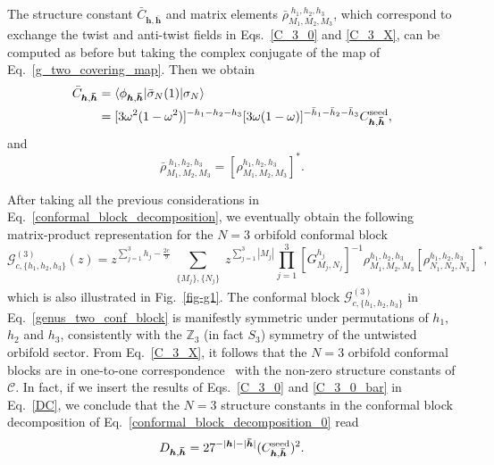 \documentclass[a4paper,11pt]{article}
\begin{document}
\noindent The structure constant $\bar{C}_{\boldsymbol{h}, \boldsymbol{\bar{h}}}$ 
and matrix elements $\bar{\rho}_{M_1, M_2, M_3}^{\;h_1, h_2, h_3}$, which 
correspond to exchange the twist and anti-twist fields in Eqs.~\eqref{C_3_0} 
and \eqref{C_3_X}, can be computed as before but taking the complex conjugate 
of the map of Eq.~\eqref{g_two_covering_map}. Then we obtain 
\begin{align}\label{C_3_0_bar}
 \bar{C}_{\boldsymbol{h}, \boldsymbol{\bar{h}}}&=
 \langle \phi_{\boldsymbol{h}, \boldsymbol{\bar{h}}}|\bar{\sigma}_N(1)|\sigma_N\rangle  \nonumber \\
 &=[3\omega^2(1-\omega^2)]^{-h_1-h_2-h_3}[3\omega(1-\omega)]^{-\bar{h}_1-\bar{h}_2-\bar{h}_3}C_{\boldsymbol{h}, \boldsymbol{\bar{h}}}^{{\rm seed}},
\end{align}
and 
\begin{equation}
\bar{\rho}_{M_1, M_2, M_3}^{\; h_1, h_2, h_3}=[\rho_{M_1, M_2, M_3}^{h_1, h_2, h_3}]^*.
\end{equation}

\noindent After taking all the previous considerations in Eq.~\eqref{conformal_block_decomposition},
we eventually obtain the following matrix-product representation for the $N=3$ orbifold 
conformal block \cite{Collier}
\begin{equation}\label{genus_two_conf_block}
 \mathcal{G}_{c, \{h_1, h_2, h_3\}}^{(3)}(z)=
z^{\sum_{j=1}^3 h_j-\frac{2c}{9}}\sum_{\substack{\{M_j\}, \{N_j\}}}
 z^{\sum\limits_{j=1}^3 |M_j|}
 \prod_{j=1}^3 [G_{M_j,N_j}^{h_j}]^{-1}
 \rho^{h_1,h_2,h_3}_{M_1,M_2,M_3}[\rho_{N_1,N_2,N_3}^{h_1,h_2,h_3}]^*,
\end{equation}
which is also illustrated in Fig.~\ref{fig-g1}.
The conformal block $\mathcal{G}_{c, \{h_1, h_2, h_3\}}^{(3)}$ in Eq.~\eqref{genus_two_conf_block} is
manifestly symmetric under permutations of $h_1$, $h_2$ and $h_3$, consistently with the $\mathbb Z_3$ 
(in fact $S_3$) symmetry of the untwisted orbifold sector. From Eq.~\eqref{C_3_X}, it follows that the 
$N=3$ orbifold conformal blocks are in one-to-one correspondence~\cite{Cardy, Collier} with the non-zero 
structure constants of $\mathcal{C}$. In fact, if we insert the results of Eqs.~\eqref{C_3_0} and \eqref{C_3_0_bar} 
in Eq.~\eqref{DC}, we conclude that the $N=3$ structure constants in the conformal block decomposition of Eq.~\eqref{conformal_block_decomposition_0} read
\begin{equation}\label{D_3}
 D_{\boldsymbol{h}, \boldsymbol{\bar{h}}}=
 27^{-|\boldsymbol{h}|-|\boldsymbol{\bar{h}}|}
 (C_{\boldsymbol{h}, \boldsymbol{\bar{h}}}^{{\rm seed}})^2.
\end{equation}
\end{document}

